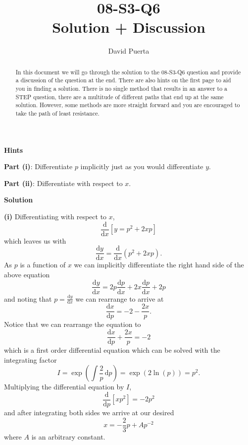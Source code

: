\documentclass{article}
\title{08-S3-Q6 \\ Solution + Discussion}
\author{David Puerta}
\date{}
\begin{document}
\maketitle

\begin{abstract}
    \noindent In this document we will go through the solution to the 08-S3-Q6 question and provide a discussion of the question at the end. There are also hints on the first page to aid you in finding a solution. There is no single method that results in an answer to a STEP question, there are a multitude of different paths that end up at the same solution. However, some methods are more straight forward and you are encouraged to take the path of least resistance.  
\end{abstract}

\vspace{1cm}

\begin{center}
    \textbf{Hints}
\end{center}

\textbf{Part (i)}: Differentiate $p$ implicitly just as you would differentiate $y$.

\vspace{1cm}

\textbf{Part (ii)}:  Differentiate with respect to $x$.


\newpage

\begin{center}
    \textbf{Solution}
\end{center}

\vspace{0.5cm}

\textbf{(i)} Differentiating with respect to $x$,
\[
\frac{\mathrm{d}}{\mathrm{d}x} \left[y = p^2 + 2xp \right] 
\]
which leaves us with 
\[
\frac{\mathrm{d}y}{\mathrm{d}x} = \frac{\mathrm{d}}{\mathrm{d}x} (p^2 + 2xp).
\]
As $p$ is a function of $x$ we can implicitly differentiate the right hand side of the above equation
\[
\frac{\mathrm{d}y}{\mathrm{d}x} = 2p  \frac{\mathrm{d}p}{\mathrm{d}x} + 2x \frac{\mathrm{d}p}{\mathrm{d}x} + 2p 
\]
and noting that $p = \frac{\mathrm{d}y}{\mathrm{d}x}$ we can rearrange to arrive at 
\[
\frac{\mathrm{d}x}{\mathrm{d}p} = -2 - \frac{2x}{p}.
\]
Notice that we can rearrange the equation to 
\[
\frac{\mathrm{d}x}{\mathrm{d}p} + \frac{2x}{p} = -2
\]
which is a first order differential equation which can be solved with the integrating factor
\begin{equation*}
I = \exp \left( \int \frac{2}{p} \,\mathrm{d}p \right) = \exp (2 \ln (p)) = p^2.
\end{equation*}
Multiplying the differential equation by $I$,
\[
\frac{\mathrm{d}}{\mathrm{d}p}[xp^2] = -2p^2
\]
and after integrating both sides we arrive at our desired
\[
x = -\frac{2}{3}p+Ap^{-2}
\]
where $A$ is an arbitrary constant.\par
\end{document}
